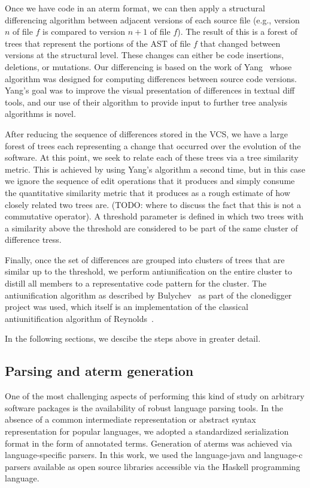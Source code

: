 \documentclass{acm_proc_article-sp}
\begin{document}
Once we have code in an aterm format, we can then apply a structural
differencing algorithm between adjacent versions of each source file (e.g.,
version $n$ of file $f$ is compared to version $n+1$ of file $f$).  The result
of this is a forest of trees that represent the portions of the AST of file
$f$ that changed between versions at the structural level.  These changes can
either be code insertions, deletions, or mutations.  Our differencing is based
on the work of Yang~\cite{yang91diff} whose algorithm was designed for computing
differences between source code versions.  Yang's goal was to improve the
visual presentation of differences in textual diff tools, and our use of their
algorithm to provide input to further tree analysis algorithms is novel.

After reducing the sequence of differences stored in the VCS, we have a large
forest of trees each representing a change that occurred over the evolution of
the software.  At this point, we seek to relate each of these trees via a 
tree similarity metric.  This is achieved by using Yang's algorithm a second time,
but in this case we ignore the sequence of edit operations that it produces and
simply consume the quantitative similarity metric that it produces as a rough
estimate of how closely related two trees are.  (TODO: where to discuss the fact that
this is not a commutative operator).  A threshold parameter is defined in which
two trees with a similarity above the threshold are considered to be part of the same
cluster of difference tress.

Finally, once the set of differences are grouped into clusters of trees that
are similar up to the threshold, we perform antiunification on the entire
cluster to distill all members to a representative code pattern for the
cluster.  The antiunification algorithm as described by
Bulychev~\cite{bulychev08dupe} as part of the clonedigger project
was used, which itself is an implementation of the classical antiunitification
algorithm of Reynolds~\cite{reynolds69antiunification}.

In the following sections, we descibe the steps above in greater detail.

\subsection{Parsing and aterm generation}

One of the most challenging aspects of performing this kind of
study on arbitrary software packages is the availability of
robust language parsing tools.  In the absence of a common intermediate
representation or abstract syntax representation for popular languages, 
we adopted a standardized serialization format in the form of annotated
terms.  Generation of aterms was achieved via language-specific parsers.
In this work, we used the language-java and language-c parsers available
as open source libraries accessible via the Haskell programming language.
\end{document}
